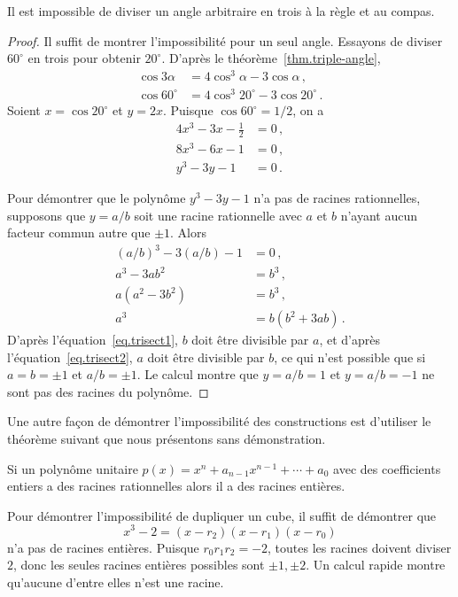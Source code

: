 \begin{theorem}
Il est impossible de diviser un angle arbitraire en trois à la règle et au  compas.
\end{theorem}
\begin{proof}
Il suffit de montrer l'impossibilité pour un seul angle. Essayons de diviser $60^\circ$ en trois pour obtenir $20^\circ$. D'après le théorème~\ref{thm.triple-angle},
\begin{align*}
\cos 3\alpha&=4\cos^3\alpha -3\cos\alpha\,,\\
\cos 60^\circ&=4\cos^3 20^\circ -3\cos 20^\circ\,.
\end{align*}
Soient $x=\cos 20^\circ$ et $y=2x$. Puisque $\cos 60^\circ=1/2$, on a 
\begin{align*}
4x^3 -3x-\frac{1}{2} &= 0\,,\\
8x^3-6x-1&=0\,,\\
y^3-3y-1&=0\,.
\end{align*}

Pour démontrer que le polynôme $y^3-3y-1$ n'a pas de racines rationnelles, supposons que $y=a/b$ soit une racine rationnelle avec $a$ et $b$ n'ayant aucun facteur commun autre que $\pm 1$. Alors 
\begin{subequations}
\begin{align}
(a/b)^3-3(a/b)-1&=0\,,\\
a^3-3ab^2&=b^3\,,\\
a(a^2-3b^2)&=b^3\,,\label{eq.trisect1}\\
a^3&=b(b^2+3ab)\label{eq.trisect2}\,.
\end{align}
\end{subequations}
D'après  l'équation~\ref{eq.trisect1}, $b$ doit être divisible par $a$, et d'après l'équation~\ref{eq.trisect2}, $a$ doit être divisible par $b$, ce qui n'est possible que si $a=b=\pm 1$ et $a/b=\pm 1$. Le calcul montre que  $y=a/b=1$ et $y=a/b=-1$ ne sont pas des racines du polynôme.
\end{proof}


Une autre façon de démontrer l'impossibilité des constructions est d'utiliser le théorème suivant que nous présentons sans démonstration.

\begin{theorem}\label{thm.factor}
Si un polynôme unitaire  $p(x)=x^n+a_{n-1}x^{n-1}+\cdots+a_0$ avec des coefficients entiers a des racines rationnelles alors il a des racines entières.
\end{theorem}

Pour démontrer l'impossibilité de dupliquer un cube, il suffit de démontrer que 
\[
x^3-2=(x-r_2)(x-r_1)(x-r_0)
\]
n'a pas de racines entières. Puisque $r_0r_1r_2=-2$, toutes les racines doivent diviser $2$, donc les seules racines entières possibles sont $\pm 1, \pm 2$. Un calcul rapide montre qu'aucune d'entre elles n'est une racine.

